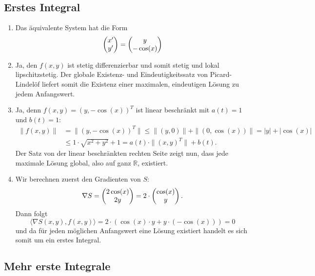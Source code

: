 \documentclass[a4paper]{article}
\begin{document}
\makeexheaderger

\subsection{Erstes Integral}

\begin{enumerate}[label=(\alph*)]
    \item Das äquivalente System hat die Form
    \begin{equation*}
        \left(\begin{matrix}x' \\ y'\end{matrix}\right) = \left(\begin{matrix}y \\ -\cos(x)\end{matrix}\right)
    \end{equation*}
    \item Ja, den $f(x,y)$ ist stetig differenzierbar und somit stetig und lokal lipschitzstetig. Der globale Existenz- und Eindeutigkeitssatz von Picard-Lindelöf liefert somit die Existenz einer maximalen, eindeutigen Lösung zu jedem Anfangswert.
    \item Ja, denn $f(x,y) = (y, -\cos(x))^T$ ist linear beschränkt mit $a(t) = 1$ und $b(t) = 1$:
    \begin{align*}
        \|f(x,y)\| &= \|(y, -\cos(x))^T\| \leq \| (y,0) \| + \|(0, \cos(x))\| = |y| + |\cos(x)|\\ &\leq 1 \cdot \sqrt{x^2 + y^2} + 1 = a(t) \cdot \|(x,y)^T\| + b(t)\text{.}
    \end{align*}
    Der Satz von der linear beschränkten rechten Seite zeigt nun, dass jede maximale Lösung global, also auf ganz $\mathds{R}$, existiert.
    \item Wir berechnen zuerst den Gradienten von $S$:
    \begin{equation*}
        \nabla S = \left(\begin{matrix}2 \cos (x) \\ 2 y\end{matrix}\right) = 2 \cdot \left(\begin{matrix}\cos(x) \\ y\end{matrix}\right)\text{.}
    \end{equation*}
    Dann folgt
    \begin{equation*}
        \langle \nabla S(x,y), f(x,y) \rangle = 2 \cdot (\cos(x) \cdot y + y \cdot (-\cos(x))) = 0
    \end{equation*}
    und da für jeden möglichen Anfangswert eine Lösung existiert handelt es sich somit um ein erstes Integral.
\end{enumerate}

\subsection{Mehr erste Integrale}
\end{document}
